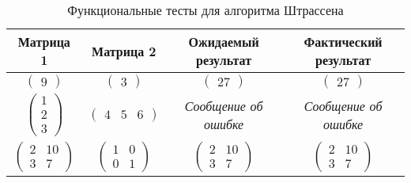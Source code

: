 \begin{table}[H]
    \small
	\begin{center}
		\caption{Функциональные тесты для алгоритма Штрассена}
		\label{tbl:func-tests-strassen}  
            \begin{tabular}{|c|c|c|c|}
            \hline
            \textbf{Матрица 1} & \textbf{Матрица 2} & \textbf{Ожидаемый результат} & \textbf{Фактический результат} \\
            \hline
            $\begin{pmatrix}
                9 
            \end{pmatrix}$ &
            $\begin{pmatrix}
                3
            \end{pmatrix}$ &
            $\begin{pmatrix}
                27
            \end{pmatrix}$ &
            $\begin{pmatrix}
                27
            \end{pmatrix}$ \\
            \hline
            $\begin{pmatrix}
                1 \\ 2 \\ 3
            \end{pmatrix}$ &
            $\begin{pmatrix}
                4 & 5 & 6
            \end{pmatrix}$ &
            \textit{Сообщение об ошибке} &
            \textit{Сообщение об ошибке} \\
            \hline
            $\begin{pmatrix}
                2 & 10 \\
                3 & 7
            \end{pmatrix}$ &
            $\begin{pmatrix}
                1 & 0 \\
                0 & 1
            \end{pmatrix}$ &
            $\begin{pmatrix}
                2 & 10 \\
                3 & 7
            \end{pmatrix}$ &
            $\begin{pmatrix}
                2 & 10 \\
                3 & 7
            \end{pmatrix}$ \\

\end{tabular}
\end{center}
\end{table}

